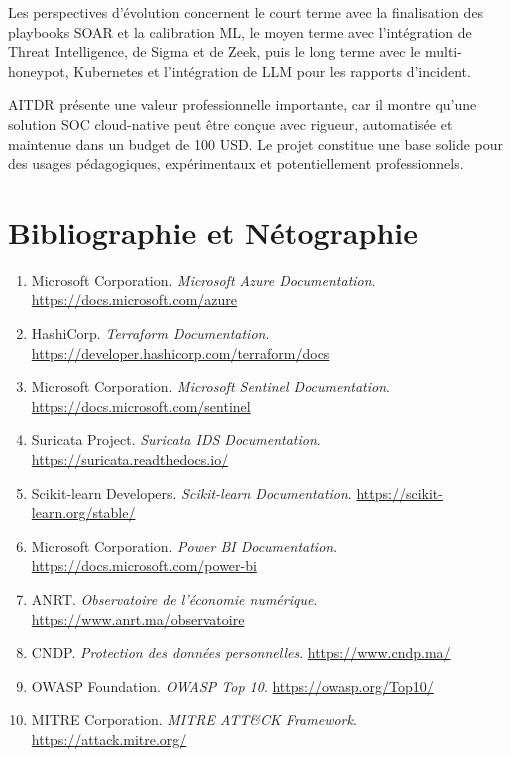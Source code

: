 \documentclass[11pt,a4paper]{report}
\begin{document}
Les perspectives d'évolution concernent le court terme avec la finalisation des playbooks SOAR et la calibration ML, le moyen terme avec l'intégration de Threat Intelligence, de Sigma et de Zeek, puis le long terme avec le multi-honeypot, Kubernetes et l'intégration de LLM pour les rapports d'incident.

AITDR présente une valeur professionnelle importante, car il montre qu'une solution SOC cloud-native peut être conçue avec rigueur, automatisée et maintenue dans un budget de 100 USD. Le projet constitue une base solide pour des usages pédagogiques, expérimentaux et potentiellement professionnels.

\chapter*{Bibliographie et Nétographie}
\begin{enumerate}
  \item Microsoft Corporation. \textit{Microsoft Azure Documentation}. \url{https://docs.microsoft.com/azure}
  \item HashiCorp. \textit{Terraform Documentation}. \url{https://developer.hashicorp.com/terraform/docs}
  \item Microsoft Corporation. \textit{Microsoft Sentinel Documentation}. \url{https://docs.microsoft.com/sentinel}
  \item Suricata Project. \textit{Suricata IDS Documentation}. \url{https://suricata.readthedocs.io/}
  \item Scikit-learn Developers. \textit{Scikit-learn Documentation}. \url{https://scikit-learn.org/stable/}
  \item Microsoft Corporation. \textit{Power BI Documentation}. \url{https://docs.microsoft.com/power-bi}
  \item ANRT. \textit{Observatoire de l'économie numérique}. \url{https://www.anrt.ma/observatoire}
  \item CNDP. \textit{Protection des données personnelles}. \url{https://www.cndp.ma/}
  \item OWASP Foundation. \textit{OWASP Top 10}. \url{https://owasp.org/Top10/}
  \item MITRE Corporation. \textit{MITRE ATT\&CK Framework}. \url{https://attack.mitre.org/}
\end{enumerate}
\end{document}
